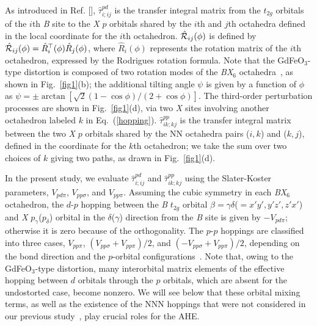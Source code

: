 \documentclass[aps,twocolumn,prb,preprintnumbers,amsmath,amssymb]{revtex4-2}
\begin{document}
As introduced in Ref. [], 
 $\hat{\tau}^{pd}_{i;ij}$ is the transfer integral matrix from the $t_{2g}$ orbitals of the $i$th {\it B} site  
 to the {\it X} $p$ orbitals shared by the $i$th and $j$th octahedra defined in the local coordinate for the $i$th octahedron.
$\hat{\cal R}_{ij}(\phi)$ is defined by $\hat{\cal R}_{ij}(\phi) = \hat{R}_{i}^\top(\phi) \hat{R}_{j}(\phi)$, 
 where $\hat{R}_i(\phi)$ represents the rotation matrix of the $i$th octahedron, expressed by the Rodrigues rotation formula.
Note that the GdFeO$_3$-type distortion is composed of two rotation modes of the {\it BX}$_6$ octahedra~\cite{okeeffe,naka3}, 
 as shown in Fig.~\ref{fig1}(b); 
 the additional tilting angle $\psi$ is given by a function of $\phi$ as $\psi=\pm\arctan [\sqrt{2}(1-\cos \phi)/(2+\cos \phi)]$.
The third-order perturbation processes are shown in Fig.~\ref{fig1}(d), 
 via two {\it X} sites involving another octahedron labeled $k$ in Eq.~(\ref{hopping}).
$\hat{\tau}^{pp}_{ik;kj}$ is the transfer integral matrix between the two {\it X} $p$ orbitals 
 shared by the NN octahedra pairs ($i, k$) and ($k, j$), 
 defined in the coordinate for the $k$th octahedron; we take the sum over two choices of $k$ giving two paths, 
 as drawn in Fig.~\ref{fig1}(d). 

In the present study, we evaluate $\hat{\tau}^{pd}_{i;ij}$ and $\hat{\tau}^{pp}_{ik;kj}$ using the Slater-Koster parameters, $V_{pd\pi}$,  $V_{pp\sigma}$, and $V_{pp\pi}$. 
Assuming the cubic symmetry in each {\it BX}$_6$ octahedron, the $d$-$p$ hopping between the {\it B} $t_{2g}$ orbital $\beta=\gamma \delta$($=x'y', y'z', z'x'$) and {\it X} $p_{\gamma}$($p_\delta$) orbital in the $\delta$($\gamma$) direction from the {\it B} site is given by $-V_{pd\pi}$; otherwise it is zero because of the orthogonality.
The $p$-$p$ hoppings are classified into three cases, $V_{pp\pi}$, $(V_{pp\sigma} + V_{pp\pi})/2$, and $(-V_{pp\sigma} + V_{pp\pi})/2$, depending on the bond direction and the $p$-orbital configurations~\cite{harrison}.
Note that, owing to the GdFeO$_3$-type distortion, many interorbital matrix elements of the effective hopping between $d$ orbitals through the $p$ orbitals, which are absent for the undostorted case, become nonzero.
We will see below that these orbital mixing terms, as well as the existence of the NNN hoppings  
 that were not considered in our previous study~\cite{naka3}, play crucial roles for the AHE. 
\end{document}

